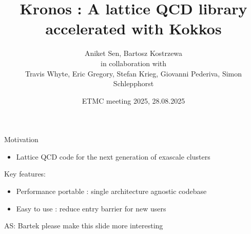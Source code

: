 
\graphicspath{{graphics/}}

\title[Kronos]{Kronos : A lattice QCD library accelerated with Kokkos}
\author[A. Sen, B. Kostrzewa]{Aniket Sen, Bartosz Kostrzewa  \\ \vspace{0.2cm} in collaboration with \\ \vspace{0.2cm} \centering Travis Whyte, Eric Gregory, Stefan Krieg, Giovanni Pederiva, Simon Schlepphorst}
\date[ETMC meeting 2025]{\small ETMC meeting 2025, 28.08.2025}
\subject{subject}




\begin{frame}
  \titlepage{}
\end{frame}


\begin{frame}{Motivation}
  \begin{itemize}
    \item Lattice QCD code for the next generation of exascale clusters
  \end{itemize} 
  \vspace{0.5cm}
  Key features: \\
  \begin{itemize}
    \item Performance portable : single architecture agnostic codebase
    \item Easy to use : reduce entry barrier for new users
  \end{itemize}


  AS: Bartek please make this slide more interesting
\end{frame}


